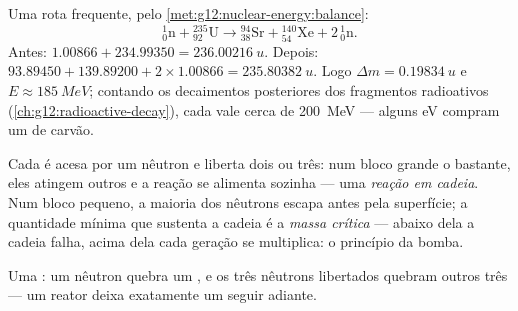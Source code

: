 \begin{example}\label{ex:g12:nuclear-energy:fissionbalance}
Uma rota frequente, pelo \cref{met:g12:nuclear-energy:balance}:
\[
{}^{1}_{0}\mathrm{n} + {}^{235}_{92}\mathrm{U} \longrightarrow
{}^{94}_{38}\mathrm{Sr} + {}^{140}_{54}\mathrm{Xe} + 2\,{}^{1}_{0}\mathrm{n}.
\]
Antes: $1.00866 + 234.99350 = \qty{236.00216}{u}$. Depois:
$93.89450 + 139.89200 + 2 \times 1.00866 = \qty{235.80382}{u}$. Logo
$\Delta m = \qty{0.19834}{u}$ e $E \approx \qty{185}{MeV}$; contando os decaimentos
posteriores dos fragmentos radioativos (\cref{ch:g12:radioactive-decay}), cada 
vale cerca de \qty{200}{MeV} --- alguns \unit{eV} compram um  de carvão.
\end{example}

\begin{definition}\label{def:g12:nuclear-energy:chain}
Cada  é acesa por um nêutron e liberta dois ou três: num bloco grande o bastante,
eles atingem outros  e a reação se alimenta sozinha --- uma \emph{reação em
cadeia}. Num bloco pequeno, a maioria dos nêutrons escapa antes
pela superfície; a quantidade mínima que sustenta a cadeia é a \emph{massa
crítica} --- abaixo dela a cadeia falha, acima dela cada geração se
multiplica: o princípio da bomba.
\end{definition}

\begin{omfigure}

{\small Uma : um nêutron quebra um , e os três nêutrons libertados
quebram outros três --- um reator deixa exatamente um seguir adiante.}
\end{omfigure}

